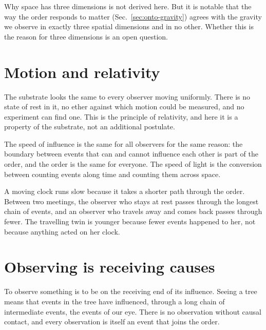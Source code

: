 Why space has three dimensions is not derived here. But it is notable that the way the order responds
to matter (Sec.~\ref{sec:onto-gravity}) agrees with the gravity we observe in exactly three spatial
dimensions and in no other. \quad Whether this is the reason for three dimensions is
an open question. 

\section{Motion and relativity}\label{sec:onto-motion}

The substrate looks the same to every observer moving uniformly. There is no state of rest in it, no
ether against which motion could be measured, and no experiment can find one. This is the principle of
relativity, and here it is a property of the substrate, not an additional postulate.

The speed of influence is the same for all observers for the same reason: the boundary between
events that can and cannot influence each other is part of the order, and the order is the same for
everyone. The speed of light is the conversion between counting events along time and counting them
across space. 

A moving clock runs slow because it takes a shorter path through the order. Between two meetings,
the observer who stays at rest passes through the longest chain of events, and an observer who
travels away and comes back passes through fewer. The travelling twin is younger because fewer
events happened to her, not because anything acted on her clock. 

\section{Observing is receiving causes}\label{sec:onto-observe}

To observe something is to be on the receiving end of its influence. Seeing a tree means that
events in the tree have influenced, through a long chain of intermediate events, the events of our
eye. There is no observation without causal contact, and every observation is itself an event that
joins the order.

